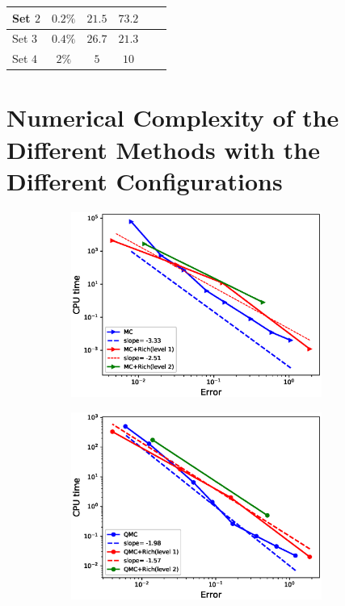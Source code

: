\documentclass[ima, 20pt, portrait, plainboxedsections]{sciposter}
\begin{document}
\begin{multicols}{3}
\begin{table}[!h]
\begin{small}
\begin{tabular}{l*{4}{c}r}
			\hline
		Set $2$    &  $0.2\%$&  $21.5$ &  $73.2$\\		
			\hline
		Set $3$   &  $0.4\%$&  $26.7$ &  $21.3$\\	
			\hline
		Set $4$ &  $2\%$&  $5$ &  $10$\\	
			\bottomrule[1.25pt]
		\end{tabular}
	\end{small}
	\label{table:Summary of our numerical results.}

\end{table}
\section*{Numerical Complexity of the Different  Methods with the Different Configurations}

\begin{figure}
	\centering
	\begin{subfigure}{0.495\textwidth}
		\centering
		\includegraphics[width=0.9\textwidth]{./rBergomi_Complexity_rates/set2/error_vs_time_set2_MC_comparison}
		\caption{}
	\end{subfigure}
	\begin{subfigure}{0.495\textwidth}
		\centering
		\includegraphics[width=0.9\textwidth]{./rBergomi_Complexity_rates/set2/error_vs_time_set2_QMC_comparison}

\end{subfigure}
\end{figure}
\end{multicols}
\end{document}
